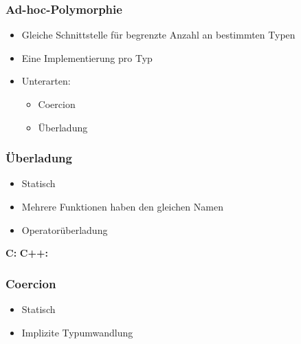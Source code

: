 {
\begin{frame}
	\frametitle{Ad-hoc-Polymorphie}
	\begin{itemize}
		\item Gleiche Schnittstelle für begrenzte Anzahl an bestimmten Typen
		\item Eine Implementierung pro Typ
		\item Unterarten:
		\begin{itemize}
			\item Coercion
			\item Überladung
		\end{itemize}
	\end{itemize}
\end{frame}
}

{
\begin{frame}
	\frametitle{Überladung}
	\begin{itemize}
		\item Statisch
		\item Mehrere Funktionen haben den gleichen Namen
		\item Operatorüberladung
	\end{itemize}
	{\scriptsize\bfseries C:}
		{\tiny\UseRawInputEncoding{}}
	{\scriptsize\bfseries C++:}
		{\tiny\UseRawInputEncoding{}}
\end{frame}
}

{
\begin{frame}
	\frametitle{Coercion}
	\begin{itemize}
		\item Statisch
		\item Implizite Typumwandlung
	\end{itemize}
	{\tiny\UseRawInputEncoding{}}
\end{frame}
}

